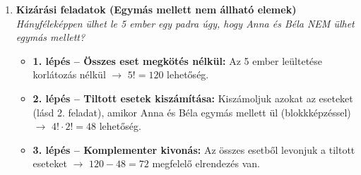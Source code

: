 \documentclass[11pt, a4paper]{article}
\begin{document}
\begin{enumerate}[label=\arabic*., leftmargin=*]
\begin{center}
    \end{center}

    \begin{itemize}
        \item \textbf{1. lépés – A "csomagok" rendezése:} Bélát és Cilit gondolatban \textbf{összeragasztjuk}, mintha ők egyetlen "csomag" lennének. Így az 5 emberből 4 "csomagunk" lett (3 normál ember + 1 ragasztott páros). Ezt a 4 csomagot $4!$-féleképpen rakhatjuk sorba.
        \item \textbf{2. lépés – FIGYELEM! A belső helycsere:} Sok diák itt megáll, és azt hiszi, $4!$ a végeredmény. \textbf{De ne feledd:} a "ragasztott csomagon" belül Béla és Cili még helyet cserélhetnek (Béla-Cili vagy Cili-Béla), ami újabb $2!=2$ lehetőséget jelent!
        \item \textbf{A hibátlan megoldás:} A külső és belső lehetőségeket össze kell szoroznunk: \textbf{$4! \cdot 2! = 24 \cdot 2 = 48$}. Tehát 48-féleképpen ülhetnek le.
    \end{itemize}

    \vspace{0.4cm}

    \item \textbf{Kizárási feladatok (Egymás mellett nem állható elemek)}\\
    \textit{Hányféleképpen ülhet le 5 ember egy padra úgy, hogy Anna és Béla NEM ülhet egymás mellett?}
    \begin{itemize}
        \item \textbf{1. lépés -- Összes eset megkötés nélkül:} Az 5 ember leültetése korlátozás nélkül $\rightarrow$ $5! = 120$ lehetőség.
        \item \textbf{2. lépés -- Tiltott esetek kiszámítása:} Kiszámoljuk azokat az eseteket (lásd 2. feladat), amikor Anna és Béla egymás mellett ül (blokkképzéssel) $\rightarrow$ $4! \cdot 2! = 48$ lehetőség.
        \item \textbf{3. lépés -- Komplementer kivonás:} Az összes esetből levonjuk a tiltott eseteket $\rightarrow$ $120 - 48 = 72$ megfelelő elrendezés van.
    \end{itemize}


\end{enumerate}
\end{document}
